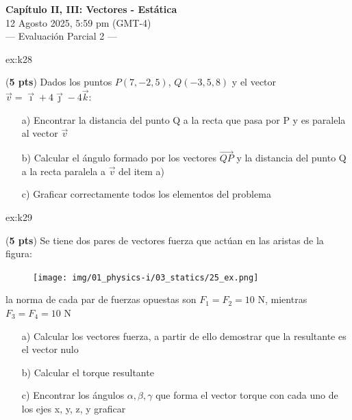  \begin{multicols}{2}
   \begin{center}
         \LARGE{\textbf{Capítulo II, III: Vectores -  Estática}}\\	
         \vspace{0.2cm}
         \large{12 Agosto 2025, 5:59 pm (GMT-4)}\\
         \large{— Evaluación Parcial 2 —}
     \end{center}
    \begin{excercise}[][][a) $d=12.29\ \mathrm{u}$; b)  $\alpha=12.11^\circ$]{ex:k28}{(\textbf{5 pts})
        Dados los puntos  $P(7,-2,5)$, $Q(-3,5,8 )$ y el vector $\vec{v}=\vec{\imath}+4\vec{\jmath}-4\vec{k}$:
        \begin{itemize}
            \item[a)] Encontrar la distancia del punto Q a la recta que pasa por P y es paralela al vector $\vec{v}$
            \item[b)] Calcular el ángulo formado por los vectores $\vec{QP}$ y la distancia del punto Q a la recta paralela a $\vec{v}$ del item a)
            \item[c)] Graficar correctamente todos los elementos del problema 
        \end{itemize}
         }
    \end{excercise}
    \begin{excercise}[][][a) $\sum \vec{F}_i=\vec{0}$; b)  $\sum\tau_i=12\sqrt{5}\vec{\imath}+(6\sqrt{5}-20)\vec{k}$,  c) $\alpha=13.79 ^\circ\, \beta=90^\circ\, \gamma=103,79^\circ$;]{ex:k29}{(\textbf{5 pts})
         Se tiene dos pares de vectores fuerza que actúan en las aristas de la figura:
         \begin{figure}[H]
             \texttt{[image: img/01\_physics-i/03\_statics/25\_ex.png]}
         \end{figure}
        la norma de cada par de  fuerzas opuestas son $F_1=F_2=10$ N, mientras $F_3=F_4=10$ N 
         \begin{itemize}
             \item[a)] Calcular los vectores fuerza, a partir de ello demostrar que la resultante es el vector nulo
             \item[b)] Calcular el torque resultante
             \item[c)] Encontrar los ángulos $\alpha, \beta, \gamma$ que forma el vector torque con cada uno de los ejes x, y, z, y  graficar
         \end{itemize}
         }
    \end{excercise}


\end{multicols}
